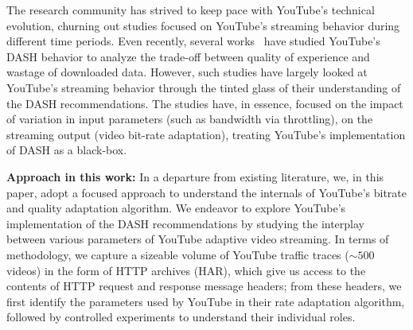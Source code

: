 \label{chap03s1:sec:introduction}


The research community has strived to keep pace with YouTube's technical evolution, churning out studies focused on YouTube's streaming behavior during different time periods.
Even recently, several works~\cite{sieber2015cost,seufert2015youtube,sieber2016sacrificing} have studied YouTube's DASH behavior to analyze the trade-off between quality of experience and wastage of downloaded data.
However, such studies have largely looked at YouTube's streaming behavior through the tinted glass of their understanding of the DASH recommendations.
The studies have, in essence, focused on the impact of variation in input parameters (such as bandwidth via throttling), on the streaming output (video bit-rate adaptation), treating YouTube's implementation of DASH as a black-box.	

{\bf Approach in this work:} In a departure from existing literature, we, in this paper, adopt a focused approach to understand the internals of YouTube's bitrate and quality adaptation algorithm.
We endeavor to explore YouTube's implementation of the DASH recommendations by studying the interplay between various parameters of YouTube adaptive video streaming.
In terms of methodology, we capture a sizeable volume of YouTube traffic traces ($\sim500$ videos) in the form of HTTP archives (HAR), which give us access to the contents of HTTP request and response message headers;
from these headers, we first identify the parameters used by YouTube in their rate adaptation algorithm, followed by controlled experiments to understand their individual roles.

